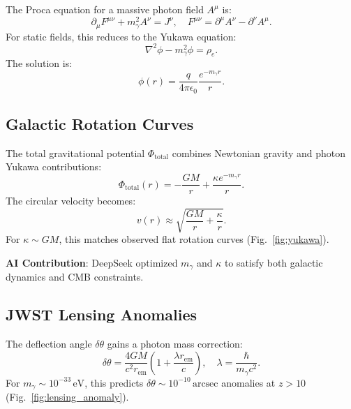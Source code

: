 \documentclass[12pt, a4paper]{article}
\begin{document}
The Proca equation for a massive photon field \( A^\mu \) is:  
\begin{equation}  
\partial_\mu F^{\mu\nu} + m_\gamma^2 A^\nu = J^\nu, \quad F^{\mu\nu} = \partial^\mu A^\nu - \partial^\nu A^\mu.  
\label{eq:proca}  
\end{equation}  
For static fields, this reduces to the Yukawa equation:  
\begin{equation}  
\nabla^2 \phi - m_\gamma^2 \phi = \rho_e.  
\label{eq:yukawa}  
\end{equation}  
The solution is:  
\begin{equation}  
\phi(r) = \frac{q}{4\pi \epsilon_0} \frac{e^{-m_\gamma r}}{r}.  
\label{eq:yukawa_sol}  
\end{equation}  

\subsection{Galactic Rotation Curves}  
\label{subsec:rotation}  

The total gravitational potential \( \Phi_{\text{total}} \) combines Newtonian gravity and photon Yukawa contributions:  
\begin{equation}  
\Phi_{\text{total}}(r) = -\frac{GM}{r} + \frac{\kappa e^{-m_\gamma r}}{r}.  
\label{eq:total_potential}  
\end{equation}  
The circular velocity becomes:  
\begin{equation}  
v(r) \approx \sqrt{\frac{GM}{r} + \frac{\kappa}{r}}.  
\label{eq:velocity}  
\end{equation}  
For \( \kappa \sim GM \), this matches observed flat rotation curves (Fig.~\ref{fig:yukawa}).  

\textbf{AI Contribution}: DeepSeek optimized \( m_\gamma \) and \( \kappa \) to satisfy both galactic dynamics and CMB constraints.  

\subsection{JWST Lensing Anomalies}  
\label{subsec:lensing}  

The deflection angle \( \delta \theta \) gains a photon mass correction:  
\begin{equation}  
\delta \theta = \frac{4GM}{c^2 r_{\text{em}}} \left(1 + \frac{\lambda r_{\text{em}}}{c}\right), \quad \lambda = \frac{\hbar}{m_\gamma c^2}.  
\label{eq:lensing}  
\end{equation}  
For \( m_\gamma \sim 10^{-33} \, \text{eV} \), this predicts \( \delta \theta \sim 10^{-10} \, \text{arcsec} \) anomalies at \( z > 10 \) (Fig.~\ref{fig:lensing_anomaly}).  
\end{document}
